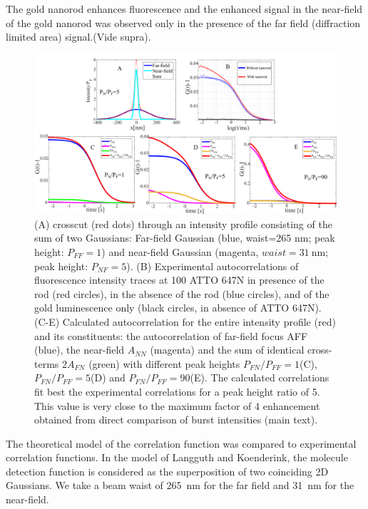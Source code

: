 \documentclass[11pt,a4paper,onecolumn]{article}
\begin{document}
The gold nanorod enhances fluorescence and the enhanced signal in the near-field of the gold nanorod was observed only in the presence of the far field (diffraction limited area) signal.(Vide supra).\\
\begin{figure}[ht]
  \centering
  \includegraphics[width=\textwidth]{calc_enhc_corr.png}
  \makeatletter
  \renewcommand{\fnum@figure}{\figurename~S\thefigure}
  \makeatother{}
  \caption{(A) crosscut (red dots) through an intensity profile consisting of the sum of two Gaussians: Far-field Gaussian (blue, waist=265 nm; peak height: $P_{FF}=1$) and near-field Gaussian (magenta, $waist=\SI{31}{\nm}$; peak height: $P_{NF}=5$).
  (B) Experimental autocorrelations of fluorescence intensity traces at \SI{100}{\nM} ATTO 647N in presence of the rod (red circles), in the absence of the rod (blue circles), and of the gold luminescence only (black circles, in absence of ATTO 647N).
  (C-E) Calculated autocorrelation for the entire intensity profile (red) and its constituents: the autocorrelation of far-field focus AFF (blue), the near-field $A_{NN}$ (magenta) and the 
  sum of identical cross-terms $2A_{FN}$ (green) with different peak heights $P_{FN}/P_{FF}=1$(C), $P_{FN}/P_{FF}=5$(D) and $P_{FN}/P_{FF}=90$(E).
  The calculated correlations fit best the experimental correlations for a peak height ratio of 5.
  This value is very close to the maximum factor of 4 enhancement obtained from direct comparison of burst intensities (main text).}
  \label{SIfig:calc_enhc_corr}
\end{figure}
The theoretical model of the correlation function was compared to experimental correlation functions.
In the model of Langguth and Koenderink\cite{langguth2016exact}, the molecule detection function is considered as the superposition of 
two coinciding 2D Gaussians.
We take a beam waist of \SI{265}{\nm} for the far field and \SI{31}{\nm} for the near-field.
\end{document}
